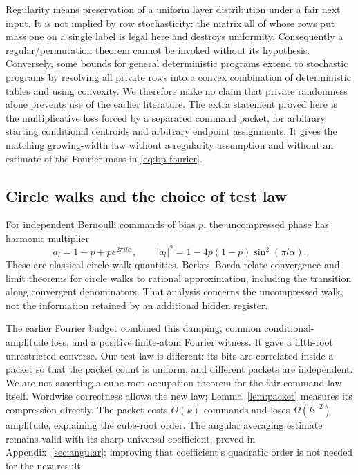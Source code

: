 Regularity means preservation of a uniform layer distribution under a
fair next input. It is not implied by row stochasticity: the matrix all
of whose rows put mass one on a single label is legal here and destroys
uniformity. Consequently a regular/permutation theorem cannot be invoked
without its hypothesis. Conversely, some bounds for general deterministic
programs extend to stochastic programs by resolving all private rows
into a convex combination of deterministic tables and using convexity.
We therefore make no claim that private randomness alone prevents use
of the earlier literature. The extra statement proved here is the
multiplicative loss forced by a separated command packet, for arbitrary
starting conditional centroids and arbitrary endpoint assignments.
It gives the matching growing-width law without a regularity assumption
and without an estimate of the Fourier mass in \eqref{eq:bp-fourier}.

\subsection{Circle walks and the choice of test law}
For independent Bernoulli commands of bias $p$, the uncompressed phase
has harmonic multiplier
\[
 a_l=1-p+p e^{2\pi il\alpha},\qquad
 |a_l|^2=1-4p(1-p)\sin^2(\pi l\alpha).
\]
These are classical circle-walk quantities. Berkes--Borda \cite{BB}
relate convergence and limit theorems for circle walks to rational
approximation, including the transition along convergent denominators.
That analysis concerns the uncompressed walk, not the information
retained by an additional hidden register.

The earlier Fourier budget \cite{GTF34} combined this damping, common
conditional-amplitude loss, and a positive finite-atom Fourier witness.
It gave a fifth-root unrestricted converse. Our test law is different:
its bits are correlated inside a packet so that the packet count is
uniform, and different packets are independent. We are not asserting a
cube-root occupation theorem for the fair-command law itself. Wordwise
correctness allows the new law; Lemma~\ref{lem:packet} measures its
compression directly. The packet costs $O(k)$ commands and loses
$\Omega(k^{-2})$ amplitude, explaining the cube-root order.
The angular averaging estimate remains valid with its sharp universal
coefficient, proved in Appendix~\ref{sec:angular}; improving that
coefficient's quadratic order is not needed for the new result.

